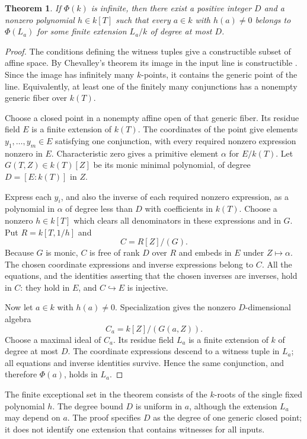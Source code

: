 \documentclass[11pt,a4paper]{article}
\newtheorem{theorem}{Theorem}[section]
\theoremstyle{definition}
\begin{document}
\begin{theorem}\label{sys:bounded-extension}
If $\Phi(k)$ is infinite, then there exist a positive integer
$D$ and a nonzero polynomial $h\in k[T]$ such that every
$a\in k$ with $h(a)\ne0$ belongs to $\Phi(L_a)$ for some finite
extension $L_a/k$ of degree at most $D$.
\end{theorem}
\begin{proof}
The conditions defining the witness tuples give a constructible
subset of affine space. By Chevalley's theorem its image in
the input line is constructible \cite{StacksChevalley}. Since
the image has infinitely many $k$-points, it contains the
generic point of the line. Equivalently, at least one of the
finitely many conjunctions has a nonempty generic fiber over
$k(T)$.

Choose a closed point in a nonempty affine open of that generic
fiber. Its residue field $E$ is a finite extension of $k(T)$.
The coordinates of the point give elements
$y_1,\ldots,y_m\in E$ satisfying one conjunction, with every
required nonzero expression nonzero in $E$. Characteristic zero
gives a primitive element $\alpha$ for $E/k(T)$. Let
$G(T,Z)\in k(T)[Z]$ be its monic minimal polynomial, of
degree $D=[E:k(T)]$ in $Z$.

Express each $y_i$, and also the inverse of each required
nonzero expression, as a polynomial in $\alpha$ of degree
less than $D$ with coefficients in $k(T)$. Choose a nonzero
$h\in k[T]$ which clears all denominators in these expressions
and in $G$. Put $R=k[T,1/h]$ and
\[
                              C=R[Z]/(G).
\]
Because $G$ is monic, $C$ is free of rank $D$ over $R$ and
embeds in $E$ under $Z\mapsto\alpha$. The chosen coordinate
expressions and inverse expressions belong to $C$. All the
equations, and the identities asserting that the chosen inverses
are inverses, hold in $C$: they hold in $E$, and $C\hookrightarrow E$
is injective.

Now let $a\in k$ with $h(a)\ne0$. Specialization gives the
nonzero $D$-dimensional algebra
\[
                             C_a=k[Z]/(G(a,Z)).
\]
Choose a maximal ideal of $C_a$. Its residue field $L_a$ is a
finite extension of $k$ of degree at most $D$. The coordinate
expressions descend to a witness tuple in $L_a$; all equations
and inverse identities survive. Hence the same conjunction,
and therefore $\Phi(a)$, holds in $L_a$.
\end{proof}

The finite exceptional set in the theorem consists of the
$k$-roots of the single fixed polynomial $h$. The degree bound
$D$ is uniform in $a$, although the extension $L_a$ may depend
on $a$. The proof specifies $D$ as the degree of one generic
closed point; it does not identify one extension that contains
witnesses for all inputs.
\end{document}
